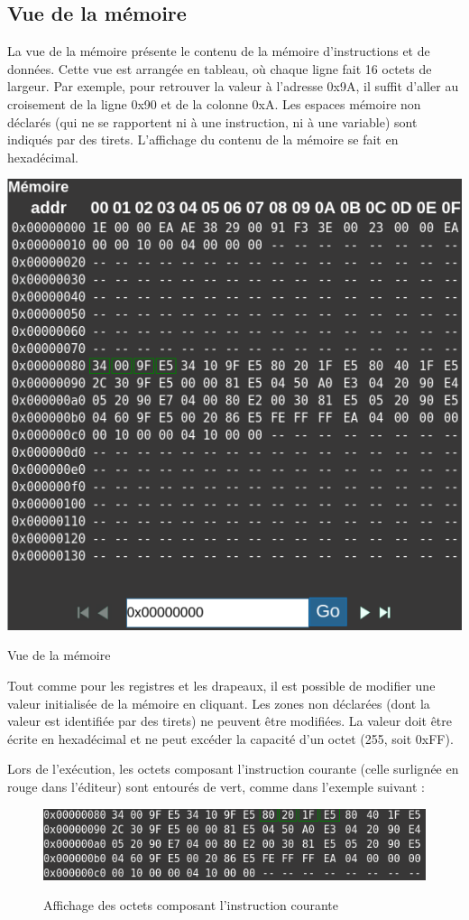 \documentclass{tufte-handout}
\begin{document}
\clearpage

\subsection{Vue de la mémoire}
 
La vue de la mémoire présente le contenu de la mémoire d'instructions et de données. Cette vue est arrangée en tableau, où chaque ligne fait 16 octets de largeur.
Par exemple, pour retrouver la valeur à l'adresse $0$x9A, il suffit d'aller au croisement de la ligne $0$x90 et de la colonne $0$xA.
Les espaces mémoire non déclarés (qui ne se rapportent ni à une instruction, ni à une variable) sont indiqués par des tirets. L'affichage du contenu de la mémoire se fait en hexadécimal.
\begin{marginfigure}
\includegraphics[width=0.9\linewidth]{pics/memoire.png}
\label{f:memoire}
\caption{Vue de la mémoire}
\end{marginfigure}
Tout comme pour les registres et les drapeaux, il est possible de modifier une valeur initialisée de la mémoire en cliquant. Les zones non déclarées (dont la valeur est identifiée par des tirets) ne peuvent être modifiées. La valeur doit être écrite en hexadécimal et ne peut excéder la capacité d'un octet (255, soit $0$xFF).

Lors de l'exécution, les octets composant l'instruction courante (celle surlignée en rouge dans l'éditeur) sont entourés de vert, comme dans l'exemple suivant :
\begin{figure}[h!]
\raggedleft
\includegraphics[width=0.8\linewidth]{pics/memoire_pc.png}
\label{f:memoirepc}
\caption{Affichage des octets composant l'instruction courante}
\end{figure}
\end{document}
